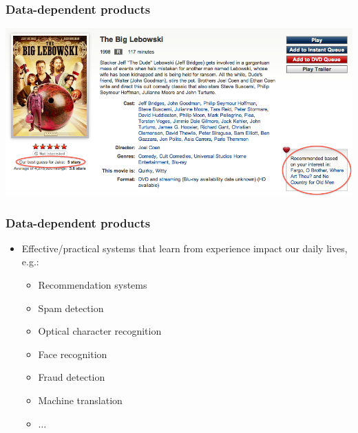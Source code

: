 \documentclass[xcolor=dvipsnames, 9pt]{beamer}
\begin{document}
\begin{frame}
  \frametitle{Data-dependent products}

    \begin{center}
      \includegraphics[width=\textwidth]{big_lebowski.png}
    \end{center}


\end{frame}


\begin{frame}
  \frametitle{Data-dependent products}

  \begin{itemize}
    \item Effective/practical systems that learn from experience impact our daily lives, e.g.:
      \begin{itemize}
        \item Recommendation systems
        \item Spam detection
        \item Optical character recognition
        \item Face recognition
        \item Fraud detection
        \item Machine translation
        \item $\ldots$
      \end{itemize}
  \end{itemize}

\end{frame}
\end{document}
